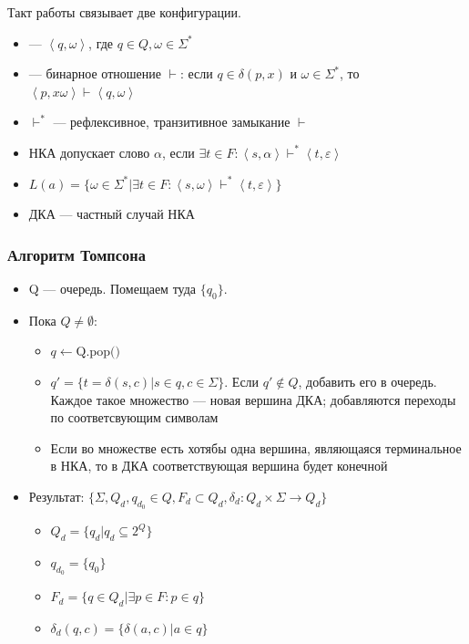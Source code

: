 \documentclass[a4paper, 14pt]{extarticle}
\begin{document}
Такт работы связывает две конфигурации.
\begin{itemize}
    \item {} --- $ \left\langle q, \omega \right\rangle $, где $ q \in Q, \omega \in \Sigma^* $
    \item {} --- бинарное отношение $\vdash$: если $ q \in \delta(p, x) $ и $ \omega \in \Sigma^* $, то $ \left\langle p, x\omega \right\rangle \vdash \left\langle q, \omega \right\rangle $
    \item $\vdash^*$ --- рефлексивное, транзитивное замыкание $\vdash$
    \item НКА допускает слово $\alpha$, если $\exists t \in F: \left\langle s, \alpha \right\rangle \vdash^* \left\langle t, \varepsilon \right\rangle $
    \item {} $ L(a) = \{ \omega \in \Sigma^* | \exists t \in F: \left\langle s, \omega \right\rangle \vdash^* \left\langle t, \varepsilon \right\rangle \} $ 
    \item ДКА --- частный случай НКА
\end{itemize}

\subsubsection*{Алгоритм Томпсона}
\begin{itemize}
    \item Q --- очередь. Помещаем туда $ \{ q_0 \} $.
    \item Пока $ Q \ne \emptyset $:
    \begin{itemize}
        \item $q \leftarrow \text{Q.pop()}$ %
        \item $ q' = \{ t = \delta(s, c) | s \in q, c \in \Sigma \} $. Если $q' \notin Q$, добавить его в очередь.\\
        Каждое такое множество --- новая вершина ДКА; добавляются переходы по соответсвующим символам
        \item Если во множестве есть хотябы одна вершина, являющаяся терминальное в НКА, то в ДКА соответствующая вершина будет конечной
    \end{itemize}
    \item Результат: $ \{ \Sigma, Q_d, q_{d_0} \in Q, F_d \subset Q_d, \delta_d: Q_d \times \Sigma \rightarrow Q_d \} $
    \begin{itemize}
        \item $ Q_d = \{ q_d | q_d \subseteq 2^Q \} $
        \item $q_{d_0} = \{ q_0 \}$
        \item $ F_d = \{ q \in Q_d | \exists p \in F: p \in q \} $
        \item $ \delta_d(q,c) = \{ \delta(a,c) | a \in q \} $
    \end{itemize}
\end{itemize}
\end{document}
